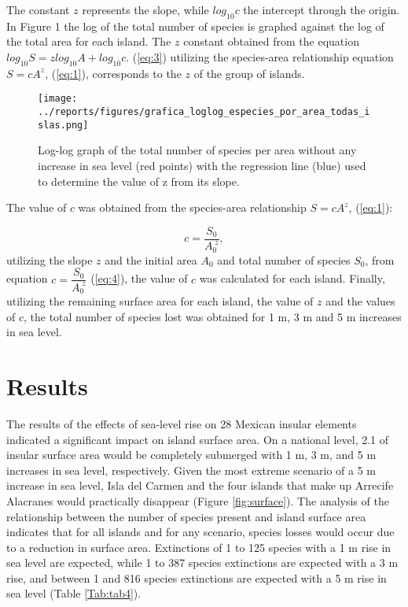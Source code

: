 \documentclass{article} %
\begin{document}
The constant $z$ represents the slope, while $log_{10}c$ the intercept through the origin. In Figure 1 the log of the total number of species is graphed against the log of the total
area for each island. The $z$ constant obtained from the equation $log_{10}S=zlog_{10}A+log_{10}c.$ (\ref{eq:3}) utilizing the species-area relationship equation $S=cA^{z}$, (\ref{eq:1}), corresponds to the $z$ of the group of islands.

\begin{figure}
  \begin{center}
  \texttt{[image: ../reports/figures/grafica\_loglog\_especies\_por\_area\_todas\_islas.png]}
  \caption{Log-log graph of the total number of species per area without any increase
in sea level (red points) with the regression line (blue) used to determine the value
of z from its slope.}
  \label{fig:loglog}
  \end{center}
\end{figure}

The value of $c$ was obtained from the species-area relationship $S=cA^{z}$, (\ref{eq:1}):


\begin{equation}
\label{eq:4}
c=\dfrac{S_{0}}{A_{0}^{\;z}},
\end{equation}
utilizing the slope $z$ and the initial area $A_{0}$ and total number of species $S_{0}$, from
equation $c=\dfrac{S_{0}}{A_{0}^{\;z}}$ (\ref{eq:4}), the value of $c$ was calculated for each island. Finally, utilizing
the remaining surface area for each island, the value of $z$ and the values of $c$, the
total number of species lost was obtained for 1 m, 3 m and 5 m increases in sea
level.


\section{Results}

The results of the effects of sea-level rise on 28 Mexican insular elements indicated
a significant impact on island surface area. On a national level, 2.1%
of insular surface area would be completely submerged with 1 m, 3 m, and 5 m
increases in sea level, respectively. Given the most extreme scenario of a 5 m
increase in sea level, Isla del Carmen and the four islands that make up Arrecife
Alacranes would practically disappear (Figure \ref{fig:surface}). The analysis of the relationship
between the number of species present and island surface area indicates that for all
islands and for any scenario, species losses would occur due to a reduction in surface
area. Extinctions of 1 to 125 species with a 1 m rise in sea level are expected, while
1 to 387 species extinctions are expected with a 3 m rise, and between 1 and 816
species extinctions are expected with a 5 m rise in sea level (Table \ref{Tab:tab4}).\\
\end{document}
